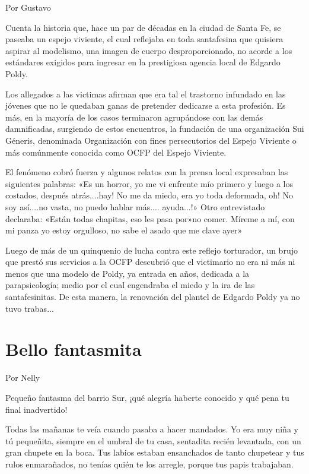 \documentclass[11pt,twoside,openright,a5paper]{book}
\begin{document}
\begin{flushright}Por Gustavo\end{flushright}


Cuenta la historia que, hace un par de décadas en la ciudad de Santa Fe, se paseaba un espejo viviente, el cual reflejaba en toda santafesina que quisiera aspirar al modelismo, una imagen de cuerpo desproporcionado, no acorde a los estándares exigidos para ingresar en la prestigiosa agencia local de Edgardo Poldy.

Los allegados a las victimas afirman que era tal el trastorno infundado en las jóvenes que no le quedaban ganas de pretender dedicarse a esta profesión. Es más, en la mayoría de los casos terminaron agrupándose con las demás damnificadas, surgiendo de estos encuentros, la fundación de una organización Sui Géneris, denominada Organización con fines persecutorios del Espejo Viviente o más comúnmente conocida como OCFP del Espejo Viviente.

El fenómeno cobró fuerza y algunos relatos con la prensa local expresaban las siguientes palabras: «Es un horror, yo me vi enfrente mío primero y luego a los costados, después atrás....hay! No me da miedo, era yo toda deformada, oh! No soy así....no vasta, no puedo hablar más.... ayuda...!» Otro entrevistado declaraba: «Están todas chapitas, eso les pasa por»no comer. Míreme a mí, con mi panza yo estoy orgulloso, no sabe el asado que me clave ayer»

Luego de más de un quinquenio de lucha contra este reflejo torturador, un brujo que prestó sus servicios a la OCFP descubrió que el victimario no era ni más ni menos que una modelo de Poldy, ya entrada en años, dedicada a la parapsicología; medio por el cual engendraba el miedo y la ira de las santafesinitas. De esta manera, la renovación del plantel de Edgardo Poldy ya no tuvo trabas...

\section*{Bello fantasmita}

                                                                                          \begin{flushright}Por Nelly\end{flushright}

Pequeño fantasma del barrio Sur, ¡qué alegría haberte conocido  y qué pena tu final inadvertido!

Todas las mañanas te veía cuando pasaba a hacer mandados. Yo era muy niña y tú pequeñita, siempre en el umbral de tu casa, sentadita recién levantada, con un gran chupete en la boca. Tus labios estaban ensanchados de tanto chupetear y tus rulos enmarañados, no tenías quién te los arregle, porque tus papis trabajaban.
\end{document}
